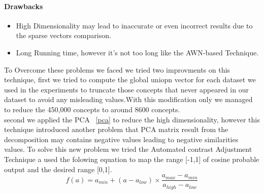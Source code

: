 \paragraph{Drawbacks}	
\begin{itemize}
\item High Dimensionality may lead to inaccurate or even incorrect results due to the sparse vectors comparison.
\item Long Running time, however it's not too long like the AWN-based Technique. 
\end{itemize}
To Overcome these problems we faced we tried two improvments on this technique, first we tried to compute the global uniopn vector for each dataset we used in the experiments to truncate those concepts that never appeared in our dataset to avoid any misleading values.With this modification only we managed to reduce the 450,000 concepts to around 8600 concepts.\\
second we applied the PCA ~\ref{pca} to reduce the high dimensionality, however this technique introduced another problem that PCA matrix result from the decomposition may contains negative values leading to negative similarities values.
To solve this new problem we tried the Automated contrast Adjustment Technique \citep{acadjstment} a used the folowing equation to map the range [-1,1] of cosine probable output and the desired range [0,1].
\begin{equation}
f(a) =a_{min}+ (a- a_{low})\times \frac{a_{max}-a_{min}}{a_{high} - a_{low}}
\end{equation}

